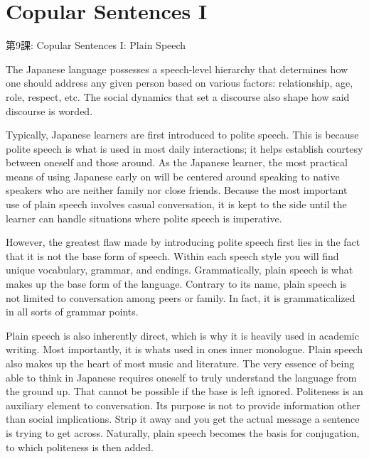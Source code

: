     
\chapter{Copular Sentences I}

\begin{center}
\begin{Large}
第9課: Copular Sentences I: Plain Speech 
\end{Large}
\end{center}
 
\par{ The Japanese language possesses a speech-level hierarchy that determines how one should address any given person based on various factors: relationship, age, role, respect, etc. The social dynamics that set a discourse also shape how said discourse is worded. }
 
\par{ Typically, Japanese learners are first introduced to polite speech. This is because polite speech is what is used in most daily interactions; it helps establish courtesy between oneself and those around. As the Japanese learner, the most practical means of using Japanese early on will be centered around speaking to native speakers who are neither family nor close friends. Because the most important use of plain speech involves casual conversation, it is kept to the side until the learner can handle situations where polite speech is imperative. }

\par{ However, the greatest flaw made by introducing polite speech first lies in the fact that it is not the base form of speech. Within each speech style you will find unique vocabulary, grammar, and endings. Grammatically, plain speech is what makes up the base form of the language. Contrary to its name, plain speech is not limited to conversation among peers or family. In fact, it is grammaticalized in all sorts of grammar points. }

\par{ Plain speech is also inherently direct, which is why it is heavily used in academic writing. Most importantly, it is what\textquotesingle s used in one\textquotesingle s inner monologue. Plain speech also makes up the heart of most music and literature. The very essence of being able to think in Japanese requires oneself to truly understand the language from the ground up. That cannot be possible if the base is left ignored. }
 Politeness is an auxiliary element to conversation. Its purpose is not to provide information other than social implications. Strip it away and you get the actual message a sentence is trying to get across. Naturally, plain speech becomes the basis for conjugation, to which politeness is then added.       
